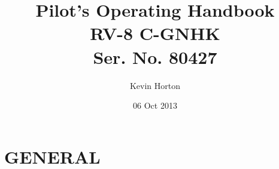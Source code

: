 \title{Pilot's Operating Handbook\\
[1in]RV-8 C-GNHK\\
[0.25in]Ser. No. 80427}

\author{Kevin Horton}

\date{06 Oct 2013}

\maketitle \clearpage

\cleardoublepage \setcounter{tocdepth}{0} 

\tableofcontents{}

\clearpage

\mainmatter

\chapter{GENERAL} \vspace{\minitocspacebefore} \minitoc \clearpage


